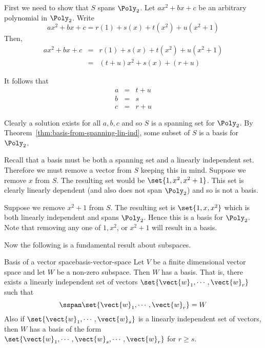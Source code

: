 \begin{solution}
First we need to show that $S$ spans $\Poly_2$. Let $ax^2 + bx + c$ be an arbitrary polynomial in $\Poly_2$. Write 
\[
ax^2 + bx + c = r(1) + s(x) + t(x^2) + u (x^2 + 1)
\]
Then,
\begin{eqnarray*}
ax^2 +bx + c &=& r(1) + s(x) + t(x^2) + u (x^2 + 1) \\
&=& (t+u) x^2 + s(x) + (r+u) 
\end{eqnarray*}

It follows that 
\begin{eqnarray*}
a &=& t + u \\
b &=& s \\
c &=& r + u 
\end{eqnarray*}

Clearly a solution exists for all $a,b,c$ and so $S$ is a spanning set for $\Poly_2$. By Theorem~\ref{thm:basis-from-spanning-lin-ind}, some subset of $S$ is a basis for $\Poly_2$. 

Recall that a basis must be both a spanning set and a linearly independent set.
Therefore we must remove a vector from $S$ keeping this in mind. Suppose we remove $x$ from $S$. The resulting set would be $\set{1, x^2, x^2 + 1 }$. This set is clearly linearly dependent (and also does not span $\Poly_2$) and so is not a basis. 

Suppose we remove $x^2 + 1$ from $S$. The resulting set is $\set{1, x, x^2 }$ which is both linearly independent and spans $\Poly_2$. Hence this is a basis for $\Poly_2$. Note that removing any one of $1, x^2$, or $x^2 + 1$ will result in a basis.
\end{solution}

Now the following is a fundamental result about subspaces.

\begin{theorem}{Basis of a vector space}{basis-vector-space}
Let $V$ be a finite dimensional vector space and let $W$ be
a non-zero subspace. Then $W$ has a basis. That is, there exists a linearly
independent set of vectors $\set{\vect{w}_{1},\cdots ,\vect{w}_{r}} $
such that 
\begin{equation*}
\sspan\set{\vect{w}_{1},\cdots ,\vect{w}_{r}} =W
\end{equation*}
Also if $\set{\vect{w}_{1},\cdots ,\vect{w}_{s}} $ is a linearly
independent set of vectors, then $W$ has a basis of the form $\set{\vect{w}
_{1},\cdots ,\vect{w}_{s},\cdots ,\vect{w}_{r}} $ for $r\geq s$.
\end{theorem}

